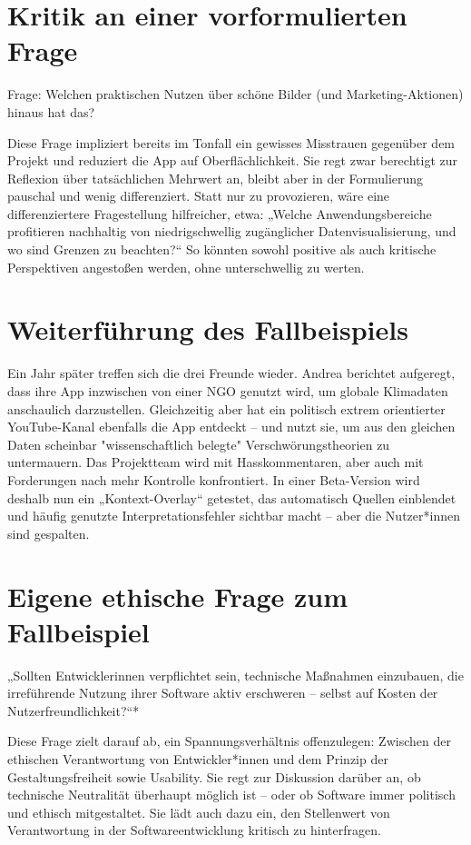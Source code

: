 \documentclass[12pt]{article}
\begin{document}
\section{Kritik an einer vorformulierten Frage}

Frage: Welchen praktischen Nutzen über schöne Bilder (und Marketing-Aktionen) hinaus hat das?

Diese Frage impliziert bereits im Tonfall ein gewisses Misstrauen gegenüber dem Projekt und reduziert die App auf Oberflächlichkeit. Sie regt zwar berechtigt zur Reflexion über tatsächlichen Mehrwert an, bleibt aber in der Formulierung pauschal und wenig differenziert. Statt nur zu provozieren, wäre eine differenziertere Fragestellung hilfreicher, etwa: „Welche Anwendungsbereiche profitieren nachhaltig von niedrigschwellig zugänglicher Datenvisualisierung, und wo sind Grenzen zu beachten?“ So könnten sowohl positive als auch kritische Perspektiven angestoßen werden, ohne unterschwellig zu werten.


\section{Weiterführung des Fallbeispiels}

Ein Jahr später treffen sich die drei Freunde wieder. Andrea berichtet aufgeregt, dass ihre App inzwischen von einer NGO genutzt wird, um globale Klimadaten anschaulich darzustellen. Gleichzeitig aber hat ein politisch extrem orientierter YouTube-Kanal ebenfalls die App entdeckt – und nutzt sie, um aus den gleichen Daten scheinbar "wissenschaftlich belegte" Verschwörungstheorien zu untermauern. Das Projektteam wird mit Hasskommentaren, aber auch mit Forderungen nach mehr Kontrolle konfrontiert. In einer Beta-Version wird deshalb nun ein „Kontext-Overlay“ getestet, das automatisch Quellen einblendet und häufig genutzte Interpretationsfehler sichtbar macht – aber die Nutzer*innen sind gespalten.


\section{Eigene ethische Frage zum Fallbeispiel}

„Sollten Entwicklerinnen verpflichtet sein, technische Maßnahmen einzubauen, die irreführende Nutzung ihrer Software aktiv erschweren – selbst auf Kosten der Nutzerfreundlichkeit?“*

Diese Frage zielt darauf ab, ein Spannungsverhältnis offenzulegen: Zwischen der ethischen Verantwortung von Entwickler*innen und dem Prinzip der Gestaltungsfreiheit sowie Usability. Sie regt zur Diskussion darüber an, ob technische Neutralität überhaupt möglich ist – oder ob Software immer politisch und ethisch mitgestaltet. Sie lädt auch dazu ein, den Stellenwert von Verantwortung in der Softwareentwicklung kritisch zu hinterfragen.
\end{document}
